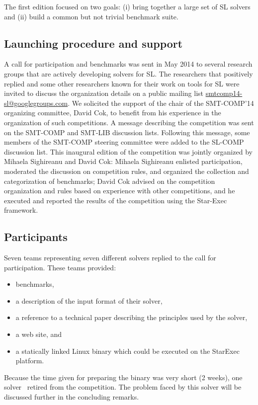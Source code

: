 \documentclass[twoside,11pt]{article}
\begin{document}
The first edition focused on two goals:
(i) bring together a large set of SL solvers and
(ii) build a common but not trivial benchmark suite. 

\subsection{Launching procedure and support}
A call for participation and benchmarks was sent
in May 2014 %
to several research groups 
that are actively developing solvers for SL.
The researchers that positively replied and some other researchers known for their work on tools for SL were invited to discuss the organization details on a public mailing list \url{smtcomp14-sl@googlegroups.com}.
We solicited the support of the chair of the SMT-COMP'14 organizing committee, David Cok, to benefit from his experience in the organization of such competitions.
A message describing the competition was sent on the SMT-COMP and SMT-LIB discussion lists. Following this message, some members of the SMT-COMP steering committee were added to the SL-COMP discussion list. 
This inaugural edition of the competition was jointly organized by Mihaela Sighireanu and David Cok:
Mihaela Sighireanu enlisted participation, moderated the discussion on competition rules, and organized the 
collection and categorization of benchmarks; David Cok advised on the competition organization and rules based on experience with other competitions, and he executed and reported the results of the competition using the Star-Exec framework.


\subsection{Participants}
Seven teams representing seven different solvers replied to the call for participation.
These teams provided:
\begin{itemize}
\item benchmarks, 
\item a description of the input format of their solver, 
\item a reference to a technical paper describing the principles used by the solver, 
\item a web site, and
\item a statically linked Linux binary which could be executed on the StarExec platform.
\end{itemize}
Because the time given for preparing the binary was very short (2 weeks), one solver~\cite{HasseIOP13}
retired from the competition. The problem faced by this solver will be discussed further in the concluding remarks.
\end{document}
